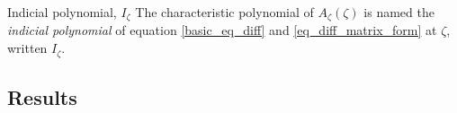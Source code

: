 \documentclass[../main.tex]{subfiles}
\begin{document}
\begin{definition}{{Indicial polynomial, $I_\zeta$}}
	The characteristic polynomial of $A_\zeta(\zeta)$ is named the \emph{indicial polynomial} of equation \eqref{basic_eq_diff} and \eqref{eq_diff_matrix_form} at $\zeta$, written $I_\zeta$.
\end{definition}

%
%	
%	
%	
%	
%	
%	
%	

\subsection{Results}
\end{document}
